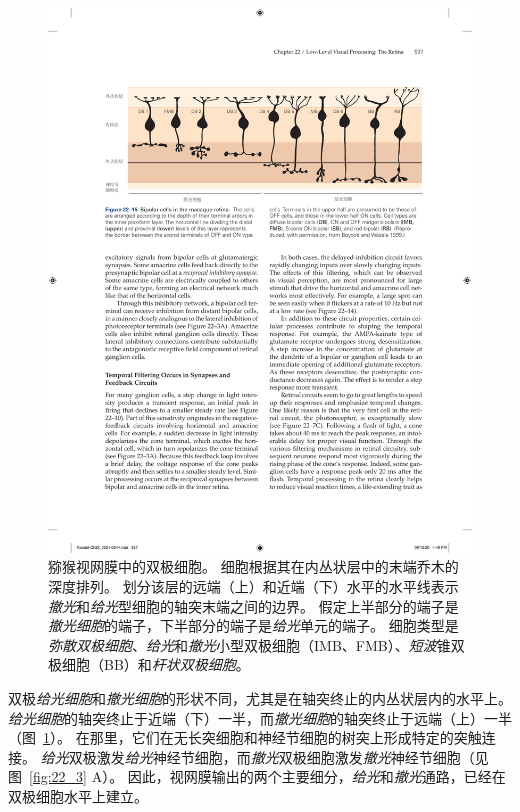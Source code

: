 \begin{figure}[htbp]
	\centering
	\includegraphics[width=1.0\linewidth]{chap22/fig_22_15}
	\caption{猕猴视网膜中的双极细胞。
		细胞根据其在内丛状层中的末端乔木的深度排列。
		划分该层的远端（上）和近端（下）水平的水平线表示\textit{撤光}和\textit{给光}型细胞的轴突末端之间的边界。
		假定上半部分的端子是 \textit{撤光细胞}的端子，下半部分的端子是\textit{给光}单元的端子。 
		细胞类型是\textit{弥散双极细胞}、\textit{给光}和\textit{撤光}小型双极细胞（IMB、FMB）、\textit{短波}锥双极细胞（BB）和\textit{杆状双极细胞}。}
	\label{fig:22_15}
\end{figure}


双极\textit{给光细胞}和\textit{撤光细胞}的形状不同，尤其是在轴突终止的内丛状层内的水平上。
\textit{给光细胞}的轴突终止于近端（下）一半，而\textit{撤光细胞}的轴突终止于远端（上）一半（图~\ref{fig:22_15}）。
在那里，它们在无长突细胞和神经节细胞的树突上形成特定的突触连接。
\textit{给光}双极激发\textit{给光}神经节细胞，而\textit{撤光}双极细胞激发\textit{撤光}神经节细胞（见图~\ref{fig:22_3} A）。
因此，视网膜输出的两个主要细分，\textit{给光}和\textit{撤光}通路，已经在双极细胞水平上建立。


